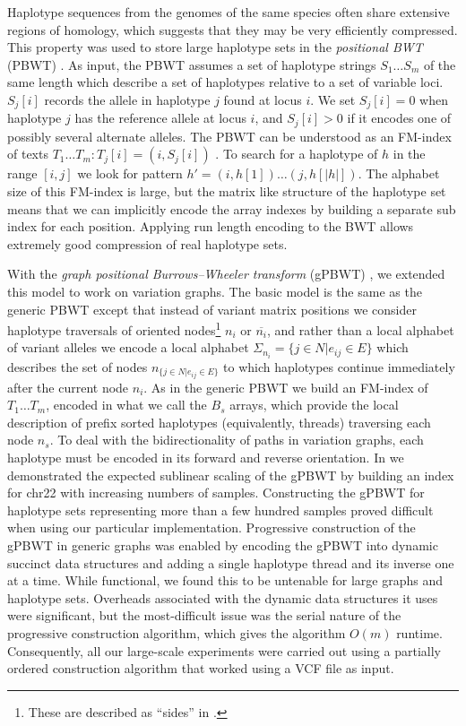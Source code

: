 Haplotype sequences from the genomes of the same species often share extensive regions of homology, which suggests that they may be very efficiently compressed.
This property was used to store large haplotype sets in the \emph{positional BWT} (PBWT) \cite{durbin2014efficient}.
As input, the PBWT assumes a set of haplotype strings $S_1 \ldots S_m$ of the same length which describe a set of haplotypes relative to a set of variable loci.
$S_j[i]$ records the allele in haplotype $j$ found at locus $i$.
We set $S_j[i] = 0$ when haplotype $j$ has the reference allele at locus $i$, and $S_j[i] > 0$ if it encodes one of possibly several alternate alleles.
The PBWT can be understood as an FM-index of texts $T_1 \ldots T_m : T_j[i] = (i, S_j[i])$ \cite{gagie2017wheeler}.
To search for a haplotype of $h$ in the range $[i,j]$ we look for pattern $h' = (i, h[1]) \ldots (j, h[|h|])$.
The alphabet size of this FM-index is large, but the matrix like structure of the haplotype set means that we can implicitly encode the array indexes by building a separate sub index for each position.
Applying run length encoding to the BWT allows extremely good compression of real haplotype sets.

With the \emph{graph positional Burrows–Wheeler transform} (gPBWT) \cite{Novak2017gPBWT}, we extended this model to work on variation graphs.
The basic model is the same as the generic PBWT except that instead of variant matrix positions we consider haplotype traversals of oriented nodes\footnote{These are described as ``sides'' in \cite{Novak2017gPBWT}.} $n_i$ or $\overline{n_i}$, and rather than a local alphabet of variant alleles we encode a local alphabet $\Sigma_{n_i} = \{ j \in N | e_{ij} \in E \}$ which describes the set of nodes $n_{\{j \in N | e_{ij} \in E \}}$ to which haplotypes continue immediately after the current node $n_i$.
As in the generic PBWT we build an FM-index of $T_1 \ldots T_m$, encoded in what we call the $B_s$ arrays, which provide the local description of prefix sorted haplotypes (equivalently, threads) traversing each node $n_s$.
To deal with the bidirectionality of paths in variation graphs, each haplotype must be encoded in its forward and reverse orientation.
In \cite{Novak2017gPBWT} we demonstrated the expected sublinear scaling of the gPBWT by building an index for chr22 with increasing numbers of samples.
Constructing the gPBWT for haplotype sets representing more than a few hundred samples proved difficult when using our particular implementation.
Progressive construction of the gPBWT in generic graphs was enabled by encoding the gPBWT into dynamic succinct data structures and adding a single haplotype thread and its inverse one at a time.
While functional, we found this to be untenable for large graphs and haplotype sets.
Overheads associated with the dynamic data structures it uses were significant, but the most-difficult issue was the serial nature of the progressive construction algorithm, which gives the algorithm $O(m)$ runtime.
Consequently, all our large-scale experiments were carried out using a partially ordered construction algorithm that worked using a VCF file as input.


